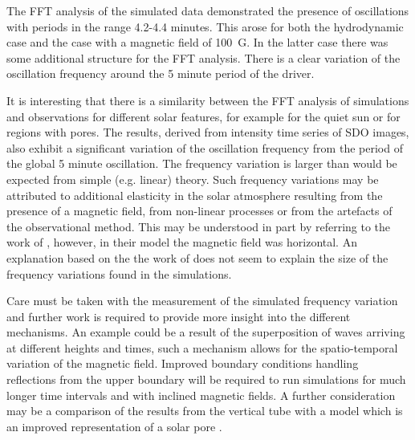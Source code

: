 \documentclass[physics,article,submit,pdftex,moreauthors]{Definitions/mdpi}
\begin{document}
The FFT analysis of the simulated data demonstrated the presence of oscillations with periods in the range 4.2-4.4 minutes. This arose for both the hydrodynamic case and the case with a magnetic field of 100~G. In  the latter case there was some additional structure for the FFT analysis. There is a clear variation of the oscillation frequency around the 5 minute period of the driver. 

It is interesting that there is a similarity between the FFT analysis  of simulations and observations for different solar features, for example for the quiet sun or for regions with pores. The results, derived from intensity time series of SDO images, also exhibit a significant variation of the oscillation frequency from the period of the global 5 minute oscillation.  The frequency variation is larger than would be expected from  simple (e.g. linear) theory. Such frequency variations may be attributed to additional elasticity in the solar atmosphere resulting from the presence of a magnetic field, from non-linear processes or from the artefacts of the observational method. This  may be understood in part by referring to the work of \cite{Campbell1989} , however, in their model the magnetic field was horizontal. An explanation based on the the work of \cite{Hindman1996} does not seem to explain the size of the frequency variations found in the simulations.

 
  
  

 
 
Care must be taken with the measurement of the simulated frequency variation and further work is required to provide more insight into the different mechanisms. An example could be a result of the superposition of waves arriving at different heights and times, such a mechanism allows for the spatio-temporal variation of the   magnetic field. Improved boundary conditions handling reflections from the upper boundary  will be required to run simulations for much longer time intervals and with inclined magnetic fields. A further consideration may be a comparison of the results from the vertical tube with a model which is an improved representation of a solar pore \cite{Simon1970} \cite{Cameron2007}.
\end{document}
